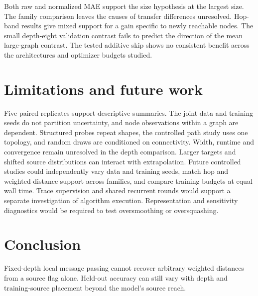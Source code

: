 \documentclass[11pt]{article}
\begin{document}
Both raw and normalized MAE support the size hypothesis at the largest size. The family comparison leaves the causes of transfer differences unresolved. Hop-band results give mixed support for a gain specific to newly reachable nodes. The small depth-eight validation contrast fails to predict the direction of the mean large-graph contrast. The tested additive skip shows no consistent benefit across the architectures and optimizer budgets studied.

\section{Limitations and future work}
Five paired replicates support descriptive summaries. The joint data and training seeds do not partition uncertainty, and node observations within a graph are dependent. Structured probes repeat shapes, the controlled path study uses one topology, and random draws are conditioned on connectivity. Width, runtime and convergence remain unresolved in the depth comparison. Larger targets and shifted source distributions can interact with extrapolation. Future controlled studies could independently vary data and training seeds, match hop and weighted-distance support across families, and compare training budgets at equal wall time. Trace supervision and shared recurrent rounds would support a separate investigation of algorithm execution. Representation and sensitivity diagnostics would be required to test oversmoothing or oversquashing.

\section{Conclusion}
Fixed-depth local message passing cannot recover arbitrary weighted distances from a source flag alone. Held-out accuracy can still vary with depth and training-source placement beyond the model's source reach.
\end{document}
